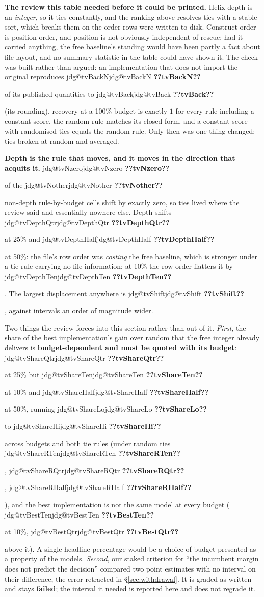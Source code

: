 \documentclass[11pt]{article}
\makeatletter
\newcommand{\jdg}[1]{%
  \ifcsname jdg@#1\endcsname\csname jdg@#1\endcsname
  \else\textbf{??#1??}\PackageError{nm}{undefined measured quantity #1}{}\fi}
\makeatother
\begin{document}
\begin{scopebox}
\textbf{The review this table needed before it could be printed.} Helix depth is an \emph{integer},
so it ties constantly, and the ranking above resolves ties with a stable sort, which breaks them
on the order rows were written to disk. Construct order is position order, and position is not obviously independent of rescue; had it
carried anything, the free baseline's standing would have been partly a fact about file layout, and
no summary statistic in the table could have shown it.
The check was built rather than argued: an implementation that does not import the original
reproduces \jdg{tvBackN} of its published quantities to \jdg{tvBack} (its rounding), recovery at a
100\% budget is exactly $1$ for every rule including a constant score, the random rule matches its
closed form, and a constant score with randomised ties equals the random rule. Only then was one
thing changed: ties broken at random and averaged.

\textbf{Depth is the rule that moves, and it moves in the direction that acquits it.}
\jdg{tvNzero} of the \jdg{tvNother} non-depth rule-by-budget cells shift by exactly zero, so ties
lived where the review said and essentially nowhere else. Depth shifts \jdg{tvDepthQtr} at 25\% and
\jdg{tvDepthHalf} at 50\%: the file's row order was \emph{costing} the free baseline, which is
stronger under a tie rule carrying no file information; at 10\% the row order flatters it by
\jdg{tvDepthTen}. The largest displacement anywhere is \jdg{tvShift}, against intervals an order of
magnitude wider.

Two things the review forces into this section rather than out of it. \emph{First}, the share of the best implementation's gain over random that the free integer already
delivers is \textbf{budget-dependent and must be quoted with its budget}: \jdg{tvShareQtr} at 25\% but
\jdg{tvShareTen} at 10\% and \jdg{tvShareHalf} at 50\%, running \jdg{tvShareLo} to \jdg{tvShareHi}
across budgets and both tie rules (under random ties \jdg{tvShareRTen}, \jdg{tvShareRQtr},
\jdg{tvShareRHalf}), and the best implementation is not the same model at every budget
(\jdg{tvBestTen} at 10\%, \jdg{tvBestQtr} above it). A single headline percentage would be a choice
of budget presented as a property of the models. \emph{Second}, our staked criterion for ``the incumbent margin does not predict the decision''
compared two point estimates with no interval on their difference, the error retracted in
\S\ref{sec:withdrawal}. It is graded as written and stays \textbf{failed}; the interval it needed
is reported here and does not regrade it.
\end{scopebox}
\end{document}
